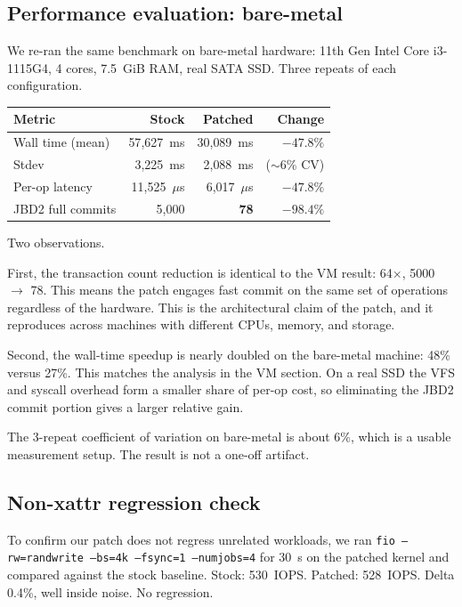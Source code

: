 \documentclass[11pt,a4paper]{article}
\begin{document}
\subsection{Performance evaluation: bare-metal}

We re-ran the same benchmark on bare-metal hardware: 11th Gen Intel
Core i3-1115G4, 4 cores, 7.5~GiB RAM, real SATA SSD. Three repeats
of each configuration.

\begin{center}
\begin{tabular}{lrrr}
\toprule
Metric & Stock & Patched & Change \\
\midrule
Wall time (mean)  & 57{,}627~ms & 30{,}089~ms & $-47.8\%$ \\
Stdev             & 3{,}225~ms  & 2{,}088~ms  & ($\sim$6\% CV) \\
Per-op latency    & 11{,}525~$\mu$s & 6{,}017~$\mu$s & $-47.8\%$ \\
JBD2 full commits & 5{,}000 & \textbf{78} & $\mathbf{-98.4\%}$ \\
\bottomrule
\end{tabular}
\end{center}

Two observations.

First, the transaction count reduction is identical to the VM
result: 64$\times$, 5000 $\to$ 78. This means the patch engages
fast commit on the same set of operations regardless of the
hardware. This is the architectural claim of the patch, and it
reproduces across machines with different CPUs, memory, and
storage.

Second, the wall-time speedup is nearly doubled on the bare-metal
machine: 48\% versus 27\%. This matches the analysis in the VM
section. On a real SSD the VFS and syscall overhead form a smaller
share of per-op cost, so eliminating the JBD2 commit portion gives
a larger relative gain.

The 3-repeat coefficient of variation on bare-metal is about 6\%,
which is a usable measurement setup. The result is not a one-off
artifact.

\subsection{Non-xattr regression check}

To confirm our patch does not regress unrelated workloads, we ran
\texttt{fio --rw=randwrite --bs=4k --fsync=1 --numjobs=4} for 30~s
on the patched kernel and compared against the stock baseline.
Stock: 530~IOPS. Patched: 528~IOPS. Delta 0.4\%, well inside noise.
No regression.
\end{document}
